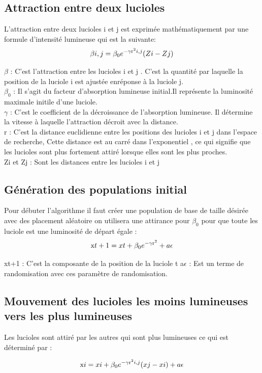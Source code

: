 \documentclass[conference]{IEEEtran}
\begin{document}
\subsection{Attraction entre deux lucioles}
L'attraction entre deux lucioles i et j est exprimée mathématiquement par une formule d'intensité lumineuse qui est la suivante:
\[ \beta{i,j} = \beta_0 e ^{-\gamma \text r^2{i,j}}(Z{i} -Z{j})  \] \cite{b2}

$\beta$ : C'est l'attraction entre les lucioles i et j . C'est la quantité par laquelle la position de la luciole i est ajustée enréponse à la luciole j. \\
$\beta_0$ : Il s'agit du facteur d'absorption lumineuse initial.Il représente la luminosité maximale initile d'une luciole. \\
$\gamma$ : C'est le coefficient de la décroissance de l'absorption lumineuse. Il détermine la vitesse à laquelle l'attraction décroit avec la distance. \\
r : C'est la distance euclidienne entre les positions des lucioles i et j dans l'espace de recherche, Cette distance est au carré dans l'exponentiel , ce qui signifie que les lucioles sont plus fortement attiré lorsque elles sont les plus proches.\\
Z{i} et Z{j} : Sont les distances entre les lucioles i et j

\subsection{Génération des populations initial}
Pour débuter l'algorithme il faut créer une population de base de taille désirée avec des placement aléatoire  on utilisera une attirance pour $\beta_0$ pour que toute les luciole est une luminosité de départ égale : 
\[\text x{t+1} = x{t}+\beta_0 e ^{-\gamma \text r^2} +  a\epsilon \]\cite{b2}

x{t+1} : C'est la composante de la position de la luciole t 
a$\epsilon$ : Est un terme de randomisation avec ces paramètre de randomisation. 

\subsection{Mouvement des lucioles les moins lumineuses vers les plus lumineuses}

Les lucioles sont attiré par les autres qui sont plus lumineuses ce qui est déterminé par : 

\[ \text x{i} = x{i}+\beta_0 e ^{-\gamma \text r^2{i,j}}(xj-xi)+ a\epsilon \] \cite{b2}
\end{document}
